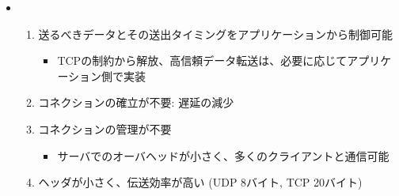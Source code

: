 \begin{itemize}
  \item {}
  \begin{enumerate}
    \item 送るべきデータとその送出タイミングをアプリケーションから制御可能
    \begin{itemize}
      \item TCPの制約から解放、高信頼データ転送は、必要に応じてアプリケーション側で実装
    \end{itemize}
    \item コネクションの確立が不要: 遅延の減少
    \item コネクションの管理が不要
    \begin{itemize}
      \item[] サーバでのオーバヘッドが小さく、多くのクライアントと通信可能
    \end{itemize}
    \item ヘッダが小さく、伝送効率が高い (UDP 8バイト, TCP 20バイト)
  \end{enumerate}
\end{itemize}
